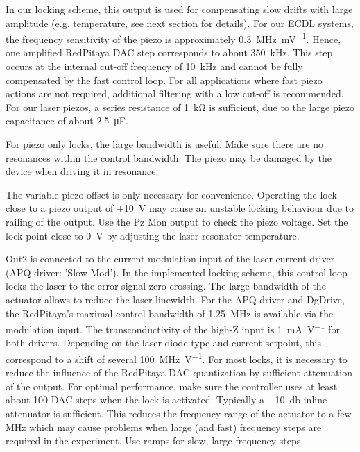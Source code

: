 \documentclass[twoside,a4paper]{refart}
\begin{document}
In our locking scheme, this output is used for compensating slow drifts with large amplitude (e.g. temperature, see next section for details). For our ECDL systems, the frequency sensitivity of the piezo is approximately \qty{+0.3}{\mega\hertz\per\milli\volt}. Hence, one amplified RedPitaya DAC step corresponds to about \qty{350}{\kilo\hertz}. This step occurs at the internal cut-off frequency of \qty{10}{\kilo\hertz} and cannot be fully compensated by the fast control loop. For all applications where fast piezo actions are not required, additional filtering with a low cut-off is recommended. For our laser piezos, a series resistance of \qty{1}{\kilo\ohm} is sufficient, due to the large piezo capacitance of about \qty{2.5}{\micro\farad}.

For piezo only locks, the large bandwidth is useful. Make sure there are no resonances within the control bandwidth. The piezo may be damaged by the device when driving it in resonance.  

The variable piezo offset is only necessary for convenience. Operating the lock close to a piezo output of $\pm$\qty{10}{\volt} may cause an unstable locking behaviour due to railing of the output. Use the Pz Mon output to check the piezo voltage. Set the lock point close to \qty{0}{\volt} by adjusting the laser resonator temperature.

Out2 is connected to the current modulation input of the laser current driver (APQ driver: 'Slow Mod'). In the implemented locking scheme, this control loop locks the laser to the error signal zero crossing. The large bandwidth of the actuator allows to reduce the laser linewidth. For the APQ driver and DgDrive, the RedPitaya's maximal control bandwidth of \qty{1.25}{\mega\hertz} is available via the modulation input. The transconductivity of the high-Z input is \qty{1}{\milli\ampere\per\volt} for both drivers. Depending on the laser diode type and current setpoint, this correspond to a shift of several \qty{100}{\mega\hertz\per\volt}. For most locks, it is necessary to reduce the influence of the RedPitaya DAC quantization by sufficient attenuation of the output. For optimal performance, make sure the controller uses at least about 100 DAC steps when the lock is activated. Typically a \qty{-10}{\decibel} inline attenuator is sufficient. This reduces the frequency range of the actuator to a few MHz which may cause problems when large (and fast) frequency steps are required in the experiment. Use ramps for slow, large frequency steps.
\end{document}
